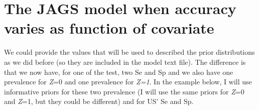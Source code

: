 \documentclass[
]{book}
\begin{document}
\section{The JAGS model when accuracy varies as function of covariate}\label{the-jags-model-when-accuracy-varies-as-function-of-covariate}

We could provide the values that will be used to described the prior distributions as we did before (so they are included in the model text file). The difference is that we now have, for one of the test, two Se and Sp and we also have one prevalence for \emph{Z}=0 and one prevalence for \emph{Z=1}. In the example below, I will use informative priors for these two prevalence (I will use the same priors for \emph{Z}=0 and \emph{Z}=1, but they could be different) and for US' Se and Sp.
\end{document}
